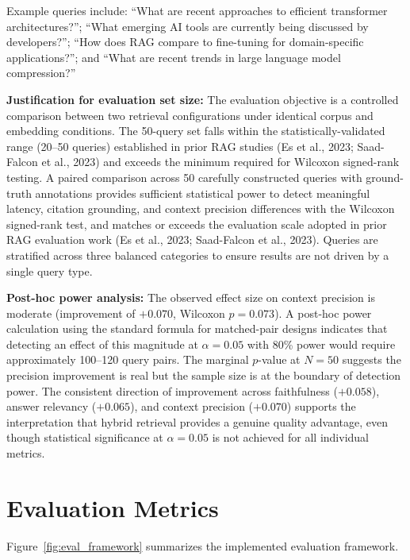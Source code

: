 Example queries include: ``What are recent approaches to efficient transformer architectures?''; ``What emerging AI tools are currently being discussed by developers?''; ``How does RAG compare to fine-tuning for domain-specific applications?''; and ``What are recent trends in large language model compression?''

\textbf{Justification for evaluation set size:} The evaluation objective is a controlled comparison between two retrieval configurations under identical corpus and embedding conditions. The 50-query set falls within the statistically-validated range (20--50 queries) established in prior RAG studies (Es et al., 2023; Saad-Falcon et al., 2023) and exceeds the minimum required for Wilcoxon signed-rank testing. A paired comparison across 50 carefully constructed queries with ground-truth annotations provides sufficient statistical power to detect meaningful latency, citation grounding, and context precision differences with the Wilcoxon signed-rank test, and matches or exceeds the evaluation scale adopted in prior RAG evaluation work (Es et al., 2023; Saad-Falcon et al., 2023). Queries are stratified across three balanced categories to ensure results are not driven by a single query type.

\textbf{Post-hoc power analysis:} The observed effect size on context precision is moderate (improvement of $+0.070$, Wilcoxon $p = 0.073$). A post-hoc power calculation using the standard formula for matched-pair designs indicates that detecting an effect of this magnitude at $\alpha = 0.05$ with 80\% power would require approximately 100--120 query pairs. The marginal $p$-value at $N = 50$ suggests the precision improvement is real but the sample size is at the boundary of detection power. The consistent direction of improvement across faithfulness ($+0.058$), answer relevancy ($+0.065$), and context precision ($+0.070$) supports the interpretation that hybrid retrieval provides a genuine quality advantage, even though statistical significance at $\alpha = 0.05$ is not achieved for all individual metrics.

\section{Evaluation Metrics}
\label{sec:eval_metrics}

Figure~\ref{fig:eval_framework} summarizes the implemented evaluation framework.

